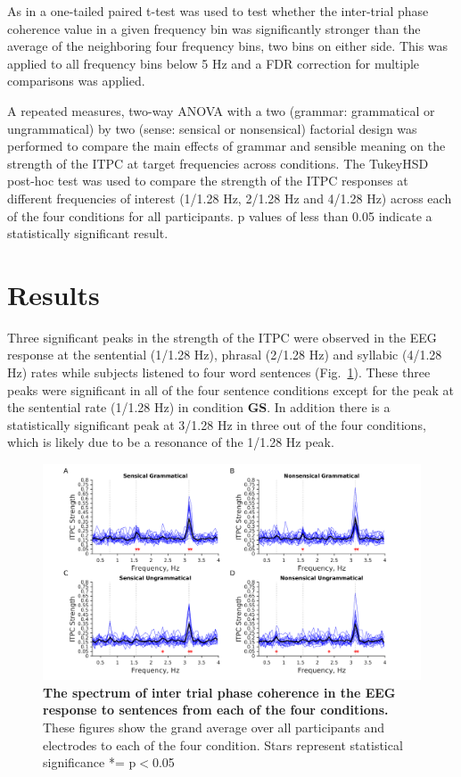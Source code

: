 \documentclass[a4paper,10pt,twoside]{article}
\begin{document}
As in \cite{DingEtAl2016} a one-tailed paired t-test was used to test whether the inter-trial phase coherence value in a given frequency bin was significantly stronger than the average of the neighboring four frequency bins, two bins on either side. This was applied to all frequency bins below 5 Hz and a FDR correction for multiple comparisons was applied. 

A repeated measures, two-way ANOVA with a two (grammar: grammatical or ungrammatical) by two (sense: sensical or nonsensical) factorial design was performed to compare the main effects of grammar and sensible meaning on the strength of the ITPC at target frequencies across conditions. The TukeyHSD post-hoc test was used to compare the strength of the ITPC responses at different frequencies of interest (1/1.28 Hz, 2/1.28 Hz and 4/1.28 Hz) across each of the four conditions for all participants. p values of less than 0.05 indicate a statistically significant result.


\section*{Results}

Three significant peaks in the strength of the ITPC were observed in the EEG response at the sentential (1/1.28 Hz), phrasal (2/1.28 Hz) and syllabic (4/1.28 Hz) rates while subjects listened to four word sentences (Fig.~\ref{Fig1}). These three peaks were significant in all of the four sentence conditions except for the peak at the sentential rate (1/1.28 Hz) in condition \textbf{GS}. In addition there is a statistically significant peak at 3/1.28 Hz in three out of the four conditions, which is likely due to be a resonance of the 1/1.28 Hz peak.

\begin{figure}[tbhp]
\includegraphics[width=\linewidth]{Exp1_grand_average_ITPC_per_condition.png}
\caption{\textbf{The spectrum of inter trial phase coherence in the EEG response to sentences from each of the four conditions.} These figures show the grand average over all participants and electrodes to each of the four condition. Stars represent
statistical significance *= p$<$0.05}
\label{Fig1}
\end{figure}
\end{document}
